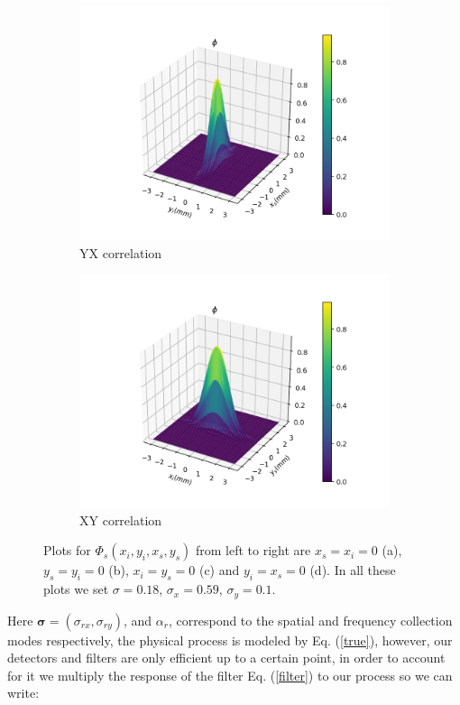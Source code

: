 \documentclass[12pt]{book}
\begin{document}
\begin{figure}[t!]
\begin{subfigure}[b]{0.45\linewidth}
\includegraphics[width=\linewidth]{images/SPDC_yx.png}
\caption{YX correlation}
\end{subfigure}
\begin{subfigure}[b]{0.45\linewidth}
\includegraphics[width=\linewidth]{images/SPDC_xy.png}
\caption{XY correlation}
\end{subfigure}
\caption{Plots for $\Phi_{s}(x_{i},y_{i},x_{s},y_{s})$  from left to right are $x_{s}=x_{i}=0$ (a), $y_{s}=y_{i}=0$ (b), $x_{i}=y_{s}=0$ (c) and $y_{i}=x_{s}=0$ (d). In all these plots we set $\sigma=0.18$, $\sigma_{x}=0.59$, $\sigma_{y}=0.1$.}
\label{SPDC}
\end{figure}

Here $\mathbf{\sigma}=(\sigma_{rx},\sigma_{ry})$, and $\alpha_{r}$, correspond to the spatial and frequency collection modes respectively, the physical process is modeled by Eq. (\ref{true}), however, our detectors and filters are only efficient up to a certain point, in order to account for it we multiply the response of the filter Eq. (\ref{filter}) to our process so we can write:
 
\end{document}
